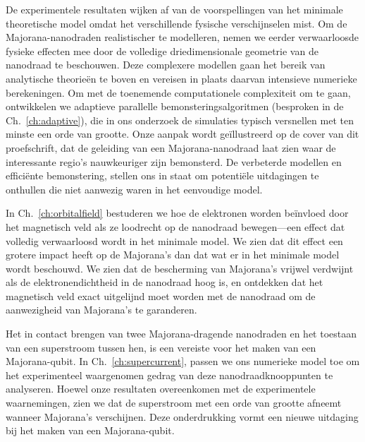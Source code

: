 {
De experimentele resultaten wijken af van de voorspellingen van het minimale theoretische model omdat het verschillende fysische verschijnselen mist.
Om de Majorana-nanodraden realistischer te modelleren, nemen we eerder verwaarloosde fysieke effecten mee door de volledige driedimensionale geometrie van de nanodraad te beschouwen.
Deze complexere modellen gaan het bereik van analytische theorieën te boven en vereisen in plaats daarvan intensieve numerieke berekeningen.
Om met de toenemende computationele complexiteit om te gaan, ontwikkelen we adaptieve parallelle bemonsteringsalgoritmen (besproken in de Ch.~\ref{ch:adaptive}), die in ons onderzoek de simulaties typisch versnellen met ten minste een orde van grootte.
Onze aanpak wordt geïllustreerd op de cover van dit proefschrift, dat de geleiding van een Majorana-nanodraad laat zien waar de interessante regio's nauwkeuriger zijn bemonsterd.
De verbeterde modellen en efficiënte bemonstering, stellen ons in staat om potentiële uitdagingen te onthullen die niet aanwezig waren in het eenvoudige model.

In Ch.~\ref{ch:orbitalfield} bestuderen we hoe de elektronen worden beïnvloed door het magnetisch veld als ze loodrecht op de nanodraad bewegen---een effect dat volledig verwaarloosd wordt in het minimale model.
We zien dat dit effect een grotere impact heeft op de Majorana's dan dat wat er in het minimale model wordt beschouwd.
We zien dat de bescherming van Majorana's vrijwel verdwijnt als de elektronendichtheid in de nanodraad hoog is, en ontdekken dat het magnetisch veld exact uitgelijnd moet worden met de nanodraad om de aanwezigheid van Majorana's te garanderen.

Het in contact brengen van twee Majorana-dragende nanodraden en het toestaan van een superstroom tussen hen, is een vereiste voor het maken van een Majorana-qubit.
In Ch.~\ref{ch:supercurrent}, passen we ons numerieke model toe om het experimenteel waargenomen gedrag van deze nanodraadknooppunten te analyseren.
Hoewel onze resultaten overeenkomen met de experimentele waarnemingen, zien we dat de superstroom met een orde van grootte afneemt wanneer Majorana's verschijnen.
Deze onderdrukking vormt een nieuwe uitdaging bij het maken van een Majorana-qubit.

}
